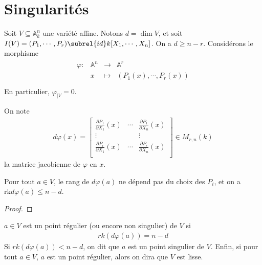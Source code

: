     \section{Singularités}
        Soit $V \subseteq \mathbb{A}^n_k$ une variété affine. Notons $d = \dim V$, et soit $I(V) = (P_1, \cdots, P_r) \subrel{id} k[X_1, \cdots, X_n]$. On a $d \geq n - r$. Considérons le morphisme
        \begin{align*}
            \begin{array}{cccc}
                \varphi : & \mathbb{A}^n & \to & \mathbb{A}^r \\
                & x & \mapsto & (P_1(x), \cdots, P_r(x)) \\
            \end{array}
        \end{align*}
        En particulier, $\varphi_{|V} = 0$.
        \begin{nota}
            On note
            \begin{align*}
                d \varphi (x) = 
                \begin{bmatrix}
                    \frac{\partial P_1}{\partial X_1}(x) & \cdots & \frac{\partial P_1}{\partial X_n}(x) \\
                    \vdots & & \vdots \\
                    \frac{\partial P_r}{\partial X_1}(x) & \cdots & \frac{\partial P_r}{\partial X_n}(x) \\
                \end{bmatrix}
                \in M_{r, n}(k)
            \end{align*}
            la matrice jacobienne de $\varphi$ en $x$.
        \end{nota}
        \begin{prop}
            Pour tout $a \in V$, le rang de $d\varphi(a)$ ne dépend pas du choix des $P_i$, et on a $\mathrm{rk} d\varphi(a) \leq n - d$.
        \end{prop}
        \begin{proof}
        \end{proof}
        \begin{defi}
            $a \in V$ est un point régulier (ou encore non singulier) de $V$ si 
            \begin{align*}
                rk (d \varphi(a)) = n - d
            \end{align*}
            Si $rk (d \varphi(a)) < n - d$, on dit que $a$ est un point singulier de $V$. Enfin, si pour tout $a \in V$, $a$ est un point régulier, alors on dira que $V$ est lisse.
        \end{defi}
